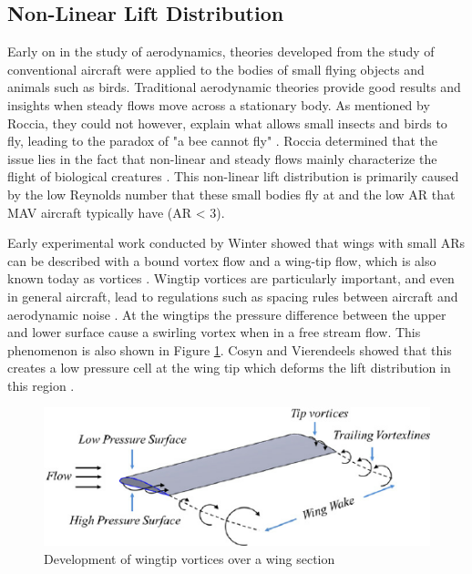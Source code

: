 
\subsection{Non-Linear Lift Distribution}


\label{sec:Non-Linear Lift Distribution}
Early on in the study of aerodynamics, theories developed from the study of conventional aircraft were applied to the bodies of small flying objects and animals such as birds. Traditional aerodynamic theories provide good results and insights when steady flows move across a stationary body. As mentioned by Roccia, they could not however, explain what allows small insects and birds to fly, leading to the paradox of "a bee cannot fly" \cite{bees} \cite{Roccia2016}. Roccia determined that the issue lies in the fact that non-linear and steady flows mainly characterize the flight of biological creatures \cite{Roccia2016}. This non-linear lift distribution is primarily caused by the low Reynolds number that these small bodies fly at and the low AR that MAV aircraft typically have (AR < 3).

 Early experimental work conducted by Winter showed that wings with small ARs can be described with a bound vortex flow and a wing-tip flow, which is also known today as vortices \cite{H1936}. Wingtip vortices are particularly important, and even in general aircraft, lead to regulations such as spacing rules between aircraft and aerodynamic noise \cite{Qin2021}. At the wingtips the pressure difference between the upper and lower surface cause a swirling vortex when in a free stream flow. This phenomenon is also shown in Figure \ref{fig:vortex}. Cosyn and Vierendeels showed that this creates a low pressure cell at the wing tip which deforms the lift distribution in this region \cite{Cosyn2006}. 
 
 \begin{figure}[H]
  \centering
  \includegraphics[width=\linewidth]{03_LiteratureReview/Figs/Development-of-wingtip-vortices-over-a-wing-section.png}
  \caption{ Development of wingtip vortices over a wing section 
 \cite{Kumar2015}}
  \label{fig:vortex}
\end{figure}

